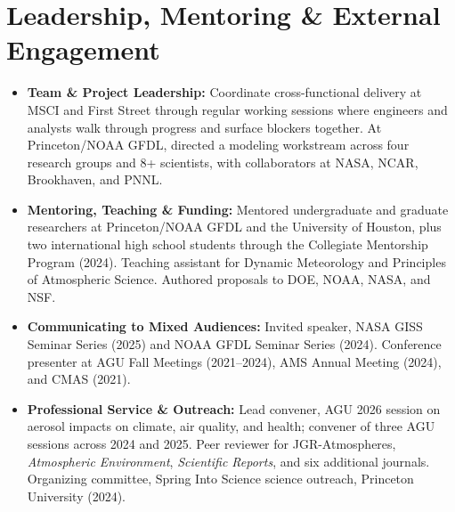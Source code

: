\documentclass[10pt]{article}
\begin{document}
\section*{Leadership, Mentoring \& External Engagement}
\begin{itemize}
  \item \textbf{Team \& Project Leadership:} Coordinate cross-functional
    delivery at MSCI and First Street through regular working sessions where
    engineers and analysts walk through progress and surface blockers
    together. At Princeton/NOAA GFDL, directed a modeling workstream across
    four research groups and 8+ scientists, with collaborators at NASA, NCAR,
    Brookhaven, and PNNL.
  \item \textbf{Mentoring, Teaching \& Funding:} Mentored undergraduate and
    graduate researchers at Princeton/NOAA GFDL and the University of
    Houston, plus two international high school students through the
    Collegiate Mentorship Program (2024). Teaching assistant for Dynamic
    Meteorology and Principles of Atmospheric Science. Authored proposals to
    DOE, NOAA, NASA, and NSF.
  \item \textbf{Communicating to Mixed Audiences:} Invited speaker, NASA GISS
    Seminar Series (2025) and NOAA GFDL Seminar Series (2024). Conference
    presenter at AGU Fall Meetings (2021--2024), AMS Annual Meeting (2024),
    and CMAS (2021).
  \item \textbf{Professional Service \& Outreach:} Lead convener, AGU 2026
    session on aerosol impacts on climate, air quality, and health; convener
    of three AGU sessions across 2024 and 2025. Peer reviewer for
    JGR-Atmospheres, \textit{Atmospheric Environment}, \textit{Scientific
    Reports}, and six additional journals. Organizing committee, Spring Into
    Science science outreach, Princeton University (2024).
\end{itemize}

\end{document}
